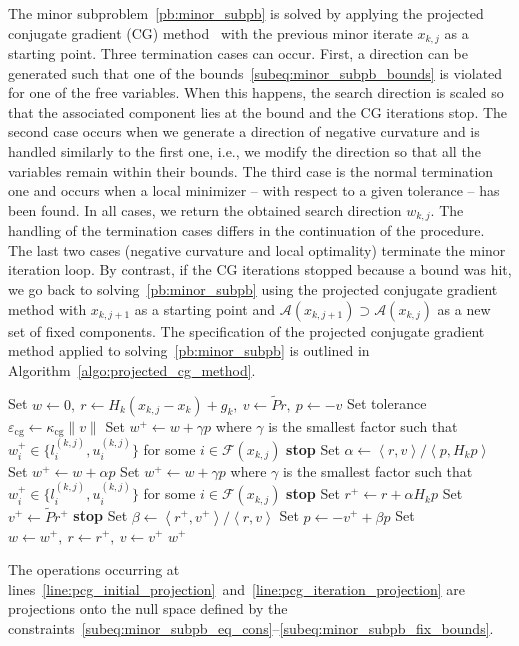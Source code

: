 \documentclass[pdflatex,sn-mathphys-num]{sn-jnl}%
\theoremstyle{thmstyleone}%
\newcommand{\calA}{{\mathcal{A}}}
\newcommand{\calF}{{\mathcal{F}}}
\newcommand{\inner}[2]{\left\langle {#1} , {#2} \right\rangle} %
\begin{document}
The minor subproblem~\eqref{pb:minor_subpb} is solved by applying the projected conjugate gradient (CG) method~\cite{gould-etal:2001} with the previous minor iterate $x_{k,j}$ as a starting point. Three termination cases can occur. First, a direction can be generated such that one of the bounds~\eqref{subeq:minor_subpb_bounds} is violated for one of the free variables. When this happens, the search direction is scaled so that the associated component lies at the bound and the CG iterations stop. The second case occurs when we generate a direction of negative curvature and is handled similarly to the first one, i.e., we modify the direction so that all the variables remain within their bounds. The third case is the normal termination one and occurs when a local minimizer -- with respect to a given tolerance -- has been found. In all cases, we return the obtained search direction $w_{k,j}$. The handling of the termination cases differs in the continuation of the procedure. The last two cases (negative curvature and local optimality) terminate the minor iteration loop. By contrast, if the CG iterations stopped because a bound was hit, we go back to solving~\eqref{pb:minor_subpb} using the projected conjugate gradient method with $x_{k,j+1}$ as a starting point and $\calA(x_{k,j+1}) \supset \calA(x_{k,j})$ as a new set of fixed components.
The specification of the projected conjugate gradient method applied to solving~\eqref{pb:minor_subpb} is outlined in Algorithm~\ref{algo:projected_cg_method}.
\begin{algorithm}
	\caption{The projected conjugate gradient method applied to~\eqref{pb:minor_subpb}}\label{algo:projected_cg_method}
	\begin{algorithmic}[1]
		\State\label{line:pcg_initial_projection}Set $w \gets 0,\ r \gets H_k(x_{k,j}-x_k)+g_k,\ v\gets \tilde{P}r,\ p \gets -v$
		\State Set tolerance $\varepsilon_{\mathrm{cg}} \gets \kappa_{\mathrm{cg}}\|v\|$
		\Repeat
		\If{$\inner{p}{H_kp}\le 0$}
		\State Set $w^+ \gets w + \gamma p$ where $\gamma$ is the smallest factor such that $w^+_i \in \{l^{(k,j)}_i,u^{(k,j)}_i\}$ for some $i \in \calF(x_{k,j})$
		\State \textbf{stop}
		\EndIf
		\State Set $\alpha \gets \inner{r}{v} / \inner{p}{H_kp}$
		\State Set $w^+ \gets w+\alpha p$
		\State Set $w^+ \gets w + \gamma p$ where $\gamma$ is the smallest factor such that $w^+_i \in \{l^{(k,j)}_i,u^{(k,j)}_i\}$ for some $i \in \calF(x_{k,j})$
		\State \textbf{stop}
		\EndIf
		\State Set $r^+ \gets r + \alpha H_kp$
		\State Set $v^+\gets \tilde{P}r^+$ \label{line:pcg_iteration_projection} 
		\If{$\sqrt{\inner{r^+}{v^+}} < \varepsilon_{\mathrm{cg}}$} \textbf{stop}
		\EndIf
		\State Set $\beta \gets \inner{r^+}{v^+} / \inner{r}{v}$ 
		\State Set $p \gets -v^+ + \beta p$
		\State Set $w\gets w^+,\ r \gets r^+,\ v \gets v^+$
		\Until{$2(n-m-|\calA(x_{k,j})|)$ iterations have been done} 
		\State{}
		\Return $w^+$
	\end{algorithmic}
\end{algorithm} 
The operations occurring at lines~\ref{line:pcg_initial_projection}~and~\ref{line:pcg_iteration_projection} are projections onto the null space defined by the constraints~\eqref{subeq:minor_subpb_eq_cons}--\eqref{subeq:minor_subpb_fix_bounds}.
\end{document}
